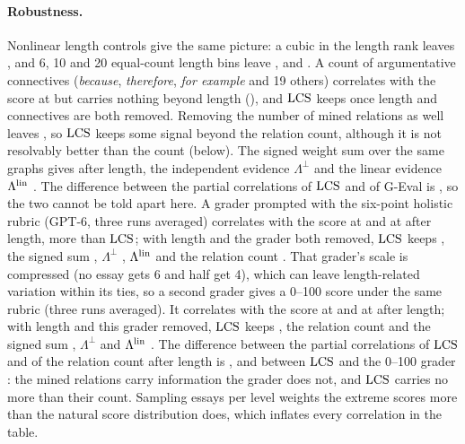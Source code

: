 \paragraph{Robustness.} Nonlinear length controls give the same picture: a cubic in the length
rank leaves \asapRobCubic{} \asapCI{\asapRobCubicLo}{\asapRobCubicHi}, and 6, 10 and 20 equal-count
length bins leave \asapRobBinsSix, \asapRobBinsOneZero{} and \asapRobBinsTwoZero. A count of
argumentative connectives (\emph{because}, \emph{therefore}, \emph{for example} and 19 others)
correlates with the score at \asapRhoConnectives{} but carries nothing beyond length
(\asapParConnectives), and $\mathrm{LCS}$ keeps \asapRobWordsConnectives{} once length and connectives are
both removed. Removing the number of mined relations as well leaves \asapRobWordsRelations{}
\asapCI{\asapRobWordsRelationsLo}{\asapRobWordsRelationsHi}, so $\mathrm{LCS}$ keeps some signal beyond the
relation count, although it is not resolvably better than the count (below). The signed weight sum over the same graphs gives \asapParWsumAsserted{} after length, the independent evidence $\Lambda^{\perp}$ \asapParIndepAsserted{}
\asapCI{\asapParIndepAssertedLo}{\asapParIndepAssertedHi} and the linear evidence $\Lambda^{\mathrm{lin}}$
\asapParLinAsserted{} \asapCI{\asapParLinAssertedLo}{\asapParLinAssertedHi}. The
difference between the partial correlations of $\mathrm{LCS}$ and of G-Eval is \asapRobDiffGeval{}
\asapCI{\asapRobDiffGevalLo}{\asapRobDiffGevalHi}, so the two cannot be told apart here. A
grader prompted with the six-point holistic rubric (GPT-6, three runs averaged) correlates with the
score at \asapRhoJudgeRubricGptSixSol{} and at \asapParJudgeRubricGptSixSol{} after length, more than
$\mathrm{LCS}$; with length and the grader both removed, $\mathrm{LCS}$ keeps \asapPwrLcsAsserted{}
\asapCI{\asapPwrLcsAssertedLo}{\asapPwrLcsAssertedHi}, the signed sum \asapPwrWsumAsserted,
$\Lambda^{\perp}$ \asapPwrIndepAsserted, $\Lambda^{\mathrm{lin}}$ \asapPwrLinAsserted{} and the relation count \asapPwrRelations. That grader's scale is compressed (no essay gets 6 and half get
4), which can leave length-related variation within its ties, so a second grader gives a 0--100
score under the same rubric (three runs averaged). It correlates with the score at
\asapRhoJudgeRubricOneZeroZeroGptSixSol{} and at \asapParJudgeRubricOneZeroZeroGptSixSol{} after length;
with length and this grader removed, $\mathrm{LCS}$ keeps \asapPwrhLcsAsserted{}
\asapCI{\asapPwrhLcsAssertedLo}{\asapPwrhLcsAssertedHi}, the relation count \asapPwrhRelations{} and
the signed sum \asapPwrhWsumAsserted, $\Lambda^{\perp}$ \asapPwrhIndepAsserted{} and $\Lambda^{\mathrm{lin}}$ \asapPwrhLinAsserted. The difference between the partial correlations of $\mathrm{LCS}$ and of
the relation count after length is \asapRobDiffRelations{}
\asapCI{\asapRobDiffRelationsLo}{\asapRobDiffRelationsHi}, and between $\mathrm{LCS}$ and the 0--100 grader
\asapRobDiffRubricOneZeroZero{} \asapCI{\asapRobDiffRubricOneZeroZeroLo}{\asapRobDiffRubricOneZeroZeroHi}:
the mined relations carry information the grader does not, and $\mathrm{LCS}$ carries no more than their
count. Sampling
\asapPerLevel{} essays per level weights the extreme scores more than the natural score
distribution does, which inflates every correlation in the table.

